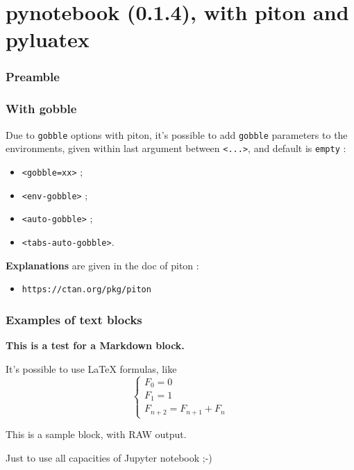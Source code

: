 \documentclass[a4paper,11pt]{article}
\def\PLver{0.1.4}
\begin{document}
\part*{pynotebook (\PLver), with piton and pyluatex}

\section{Preamble}


\section{With gobble}

Due to \texttt{gobble} options with \textsf{piton}, it's possible to add \texttt{gobble} parameters to the environments, given within last argument between \texttt{<...>}, and default is \texttt{empty} :

\begin{itemize}
	\item \texttt{<gobble=xx>} ;
	\item \texttt{<env-gobble>} ;
	\item \texttt{<auto-gobble>} ;
	\item \texttt{<tabs-auto-gobble>}.
\end{itemize}

\noindent{}\textbf{Explanations} are given in the doc of \textsf{piton} :

\begin{itemize}
	\item \texttt{https://ctan.org/pkg/piton}
\end{itemize}

\section{Examples of text blocks}

\begin{codehigh}
\begin{NotebookPitonMarkdown}{\linewidth}
{\Large\bfseries This is a test for a \textsf{Markdown} block.}

It's possible to use \LaTeX{} formulas, like %
\[
  \left\lbrace\begin{array}{l}
    F_0 = 0\\
    F_1 = 1 \\
    F_{n+2} = F_{n+1} + F_n
  \end{array}\right.
\]
\end{NotebookPitonMarkdown}

\begin{NotebookPitonRaw}{\linewidth}
This is a sample block, with RAW output.

Just to use all capacities of Jupyter notebook ;-)
\end{NotebookPitonRaw}
\end{codehigh}
\end{document}
